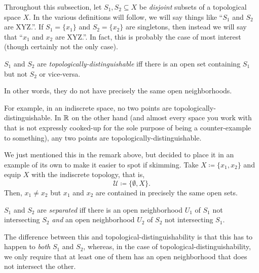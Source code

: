 Throughout this subsection, let $S_1,S_2\subseteq X$ be \emph{disjoint} subsets of a topological space $X$.  In the various definitions will follow, we will say things like ``$S_1$ and $S_2$ are XYZ.''.  If $S_1=\{ x_1\}$ and $S_2=\{ x_2\}$ are singletons, then instead we will say that ``$x_1$ and $x_2$ are XYZ.''.  In fact, this is probably the case of most interest (though certainly not the only case).
\begin{dfn}\label{TopologicallyDistinguishable}
$S_1$ and $S_2$ are \emph{topologically-distinguish\-able} iff there is an open set containing $S_1$ but not $S_2$ or vice-versa.
\begin{rmk}
In other words, they do not have precisely the same open neighborhoods.
\end{rmk}
\begin{rmk}
For example, in an indiscrete space, no two points are topologically-distinguishable.  In $\mathbb{R}$ on the other hand (and almost every space you work with that is not expressly cooked-up for the sole purpose of being a counter-example to something), any two points are topologically-distinguishable.
\end{rmk}
\end{dfn}
\begin{exm}\label{exm4.5.2}
We just mentioned this in the remark above, but decided to place it in an example of its own to make it easier to spot if skimming.  Take $X\coloneqq \{ x_1,x_2\}$ and equip $X$ with the indiscrete topology, that is,
\begin{equation}
\mathcal{U}\coloneqq \{ \emptyset ,X\} .
\end{equation}
Then, $x_1\neq x_2$ but $x_1$ and $x_2$ are contained in precisely the same open sets.
\end{exm}
\begin{dfn}[Separated]\label{Separated}
$S_1$ and $S_2$ are \emph{separated} iff there is an open neighborhood $U_1$ of $S_1$ not intersecting $S_2$ \emph{and} an open neighborhood $U_2$ of $S_2$ not intersecting $S_1$.
\begin{rmk}
The difference between this and topological-distinguishability is that this has to happen to \emph{both} $S_1$ and $S_2$, whereas, in the case of topological-distinguishability, we only require that at least one of them has an open neighborhood that does not intersect the other.
\end{rmk}
\end{dfn}
